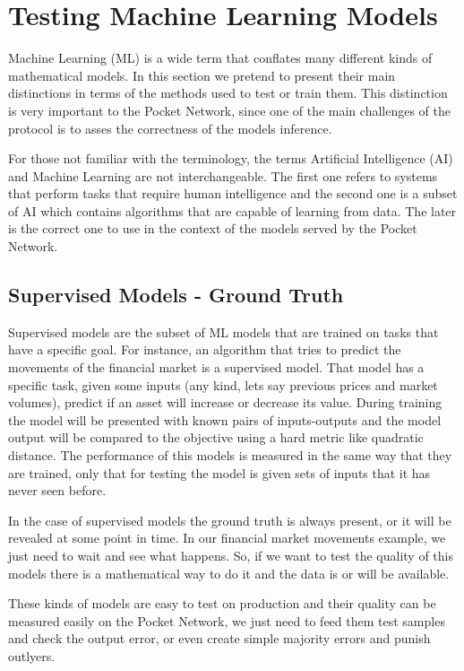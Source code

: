 \section{Testing Machine Learning Models}\label{sec:ref}

Machine Learning (ML) is a wide term that conflates many different kinds of mathematical models. In this section we pretend to present their main distinctions in terms of the methods used to test or train them. This distinction is very important to the Pocket Network, since one of the main challenges of the protocol is to asses the correctness of the models inference. 

For those not familiar with the terminology, the terms Artificial Intelligence (AI) and Machine Learning are not interchangeable. The first one refers to systems that perform tasks that require human intelligence and the second one is a subset of AI which contains algorithms that are capable of learning from data. The later is the correct one to use in the context of the models served by the Pocket Network.

\subsection{Supervised Models - Ground Truth}
Supervised models are the subset of ML models that are trained on tasks that have a specific goal. For instance, an algorithm that tries to predict the movements of the financial market is a supervised model. That model has a specific task, given some inputs (any kind, lets say previous prices and market volumes), predict if an asset will increase or decrease its value. During training the model will be presented with known pairs of inputs-outputs and the model output will be compared to the objective using a hard metric like quadratic distance.
The performance of this models is measured in the same way that they are trained, only that for testing the model is given sets of inputs that it has never seen before.

In the case of supervised models the ground truth is always present, or it will be revealed at some point in time. In our financial market movements example, we just need to wait and see what happens. So, if we want to test the quality of this models there is a mathematical way to do it and the data is or will be available. 

These kinds of models are easy to test on production and their quality can be measured easily on the Pocket Network, we just need to feed them test samples and check the output error, or even create simple majority errors and punish outlyers.

